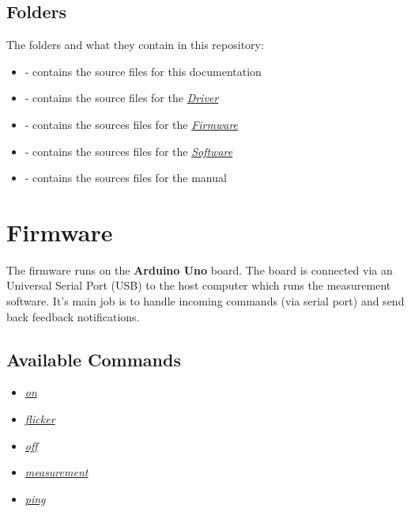 \section{Folders}
\label{source/structure:folders}
The folders and what they contain in this repository:
\begin{itemize}
\item {}
 - contains the source files for this documentation

\item {}
 - contains the source files for the {\hyperref[source/driver::doc]{\emph{\emph{Driver}}}}

\item {}
 - contains the sources files for the {\hyperref[source/firmware::doc]{\emph{\emph{Firmware}}}}

\item {}
 - contains the sources files for the {\hyperref[source/software::doc]{\emph{\emph{Software}}}}

\item {}
 - contains the sources files for the manual

\end{itemize}


\chapter{Firmware}
\label{source/firmware:firmware}\label{source/firmware::doc}
The firmware runs on the \textbf{Arduino Uno} board. The board is connected via an Universal Serial Port (USB) to the host computer which runs the measurement software. It's main job is to handle incoming commands (via serial port) and send back feedback notifications.


\section{Available Commands}
\label{source/firmware:available-commands}\begin{itemize}
\item {}
{\hyperref[appendix/led-protocol:protocol-input-on]{\emph{on}}}

\item {}
{\hyperref[appendix/led-protocol:protocol-input-flicker]{\emph{flicker}}}

\item {}
{\hyperref[appendix/led-protocol:protocol-input-off]{\emph{off}}}

\item {}
{\hyperref[appendix/led-protocol:protocol-input-measurement]{\emph{measurement}}}

\item {}
{\hyperref[appendix/led-protocol:protocol-input-ping]{\emph{ping}}}

\end{itemize}

